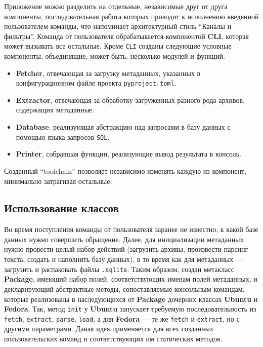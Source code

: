 Приложение можно разделить на отдельные, независимые друг от друга компоненты, последовательная работа которых приводит к исполнению введенной пользователем команды, что напоминает архитектурный стиль \enquote{Каналы и фильтры}.
Команда от пользователя обрабатывается компонентой \textbf{CLI}, которая может вызывать все остальные.
Кроме \texttt{CLI} созданы следующие условные компоненты, объединящие, может быть, несколько модулей и функций.
\begin{itemize}
	\item \textbf{Fetcher}, отвечающая за загрузку метаданных, указанных в конфигурационном файле проекта \texttt{pyproject.toml}.
	\item \textbf{Extractor}, отвечающая за обработку загруженных разного рода архивов, содержащих метаданные.
	\item \textbf{Database}, реализующая абстракцию над запросами в базу данных с помощью языка запросов \texttt{SQL}.
	\item \textbf{Printer}, собравшая функции, реализующие вывод результата в консоль.
\end{itemize}

Созданный \enquote{toolchain} позволяет независимо изменять каждую из компонент, минимально затрагивая остальные.

\subsection{Использование классов}
Во время поступления команды от пользователя заранее не известно, к какой базе данных нужно совершить обращение. Далее, для инициализации метаданных {\ubuntu} нужно провести целый набор действий (загрузить архивы, произвести парсинг текста, создать и наполнить базу данных), в то время как для метаданных {\fedora} --- загрузить и распаковать файлы \texttt{.sqlite}.
Таким образом, создан метакласс \textbf{Package}, имеющий набор полей, соответствующих именам полей метаданных, и декларирующий абстрактные методы, сопоставляемые консольным командам, которые реализованы в наследующихся от \textbf{Package} дочерних классах \textbf{Ubuntu} и \textbf{Fedora}.
Так, метод \texttt{init} у \textbf{Ubuntu} запускает требуемую последовательность из \texttt{fetch}, \texttt{extract}, \texttt{parse}, \texttt{load}, а для \textbf{Fedora} --- те же \texttt{fetch} и \texttt{extract}, но с другими параметрами.
Даная идея применяется для всех созданных пользовательских команд и соответствующих им статических методов.
